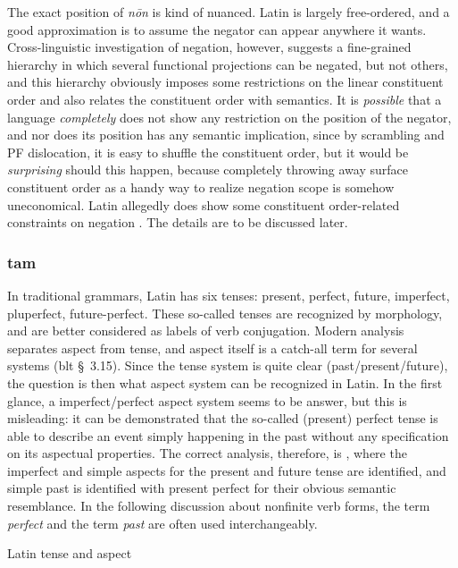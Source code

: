 \documentclass{article}
\newcommand*{\citesec}[1]{\S~{#1}}
\newcommand*{\term}[1]{\emph{#1}}
\newcommand*{\corpus}[1]{\emph{#1}}
\begin{document}
The exact position of \corpus{n\={o}n} is kind of nuanced.
Latin is largely free-ordered, 
and a good approximation is to assume the negator can appear anywhere it wants.
Cross-linguistic investigation of negation,
however, suggests a fine-grained hierarchy in which several functional projections can be negated,
but not others, 
and this hierarchy obviously imposes some restrictions on the linear constituent order 
and also relates the constituent order with semantics.
It is \emph{possible} that a language \emph{completely} does not show 
any restriction on the position of the negator,
and nor does its position has any semantic implication,
since by scrambling and PF dislocation,
it is easy to shuffle the constituent order,
but it would be \emph{surprising} should this happen,
because completely throwing away surface constituent order as a handy way to realize negation scope
is somehow uneconomical.
Latin allegedly does show some constituent order-related constraints on negation \citep{tierney2018syntactic}.
The details are to be discussed later.

\subsubsection{\ac{tam}}\label{sec:tam-abs}

In traditional grammars, Latin has six tenses:
present, perfect, future, imperfect, pluperfect, future-perfect.
These so-called tenses are recognized by morphology,
and are better considered as labels of verb conjugation.
Modern analysis separates aspect from tense,
and aspect itself is a catch-all term for several systems (\ac{blt} \citesec{3.15}).
Since the tense system is quite clear (past/present/future),
the question is then what aspect system can be recognized in Latin.
In the first glance, a imperfect/perfect aspect system seems to be answer,
but this is misleading:
it can be demonstrated that the so-called (present) perfect tense 
is able to describe an event simply happening in the past without any specification on its aspectual properties.
The correct analysis, therefore, is ,
where the imperfect and simple aspects for the present and future tense are identified,
and simple past is identified with present perfect for their obvious semantic resemblance.
In the following discussion about nonfinite verb forms, 
the term \term{perfect} and the term \term{past} are often used interchangeably.

\begin{table}
    \caption{Latin tense and aspect}
    \label{tbl:latin-tense-aspect}
    \centering
        
\end{table}
\end{document}
